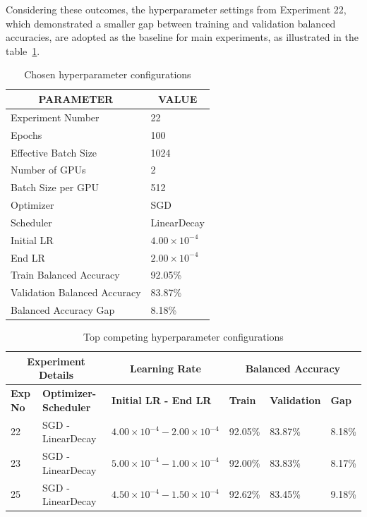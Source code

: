 Considering these outcomes, the hyperparameter settings from Experiment 22, which demonstrated a smaller gap between training and validation balanced accuracies, are adopted as the baseline for main experiments, as illustrated in the table~\ref{table:chosen hyperparameter configurations}.

\begin{table}[ht]
\caption{Chosen hyperparameter configurations}
\label{table:chosen hyperparameter configurations}
\centering
\begin{tabular}{ll}
\multicolumn{1}{c}{\textbf{PARAMETER}} & \multicolumn{1}{c}{\textbf{VALUE}} \\
\hline
Experiment Number & 22 \\
Epochs & 100 \\
Effective Batch Size & 1024 \\
Number of GPUs & 2 \\
Batch Size per GPU & 512 \\
Optimizer & SGD \\
Scheduler & LinearDecay \\
Initial LR & $4.00 \times 10^{-4}$ \\
End LR & $2.00 \times 10^{-4}$ \\
Train Balanced Accuracy & 92.05\% \\
Validation Balanced Accuracy & 83.87\% \\
Balanced Accuracy Gap & 8.18\% \\
\hline
\end{tabular}
\end{table}

\begin{table}[ht]
\caption{Top competing hyperparameter configurations}
\label{table:top-competitors}
\centering
\small
\begin{tabular}{llllll}
\multicolumn{2}{c}{\textbf{Experiment Details}} & \multicolumn{1}{c}{\textbf{Learning Rate}} & \multicolumn{3}{c}{\textbf{Balanced Accuracy}} \\
\hline
\textbf{Exp No} & \textbf{Optimizer-Scheduler} & \textbf{Initial LR - End LR} & \textbf{Train} & \textbf{Validation} & \textbf{Gap} \\
\hline
22 & SGD - LinearDecay & $4.00 \times 10^{-4} - 2.00 \times 10^{-4}$ & 92.05\% & 83.87\% & 8.18\% \\
23 & SGD - LinearDecay & $5.00 \times 10^{-4} - 1.00 \times 10^{-4}$ & 92.00\% & 83.83\% & 8.17\% \\
25 & SGD - LinearDecay & $4.50 \times 10^{-4} - 1.50 \times 10^{-4}$ & 92.62\% & 83.45\% & 9.18\% \\
\hline
\end{tabular}
\end{table}

